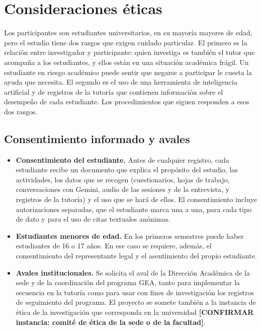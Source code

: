 \section{Consideraciones éticas}
\label{sec:consideraciones_eticas}

Los participantes son estudiantes universitarios, en su mayoría mayores de edad, pero el estudio tiene dos rasgos que exigen cuidado particular. El primero es la relación entre investigador y participante: quien investiga es también el tutor que acompaña a los estudiantes, y ellos están en una situación académica frágil. Un estudiante en riesgo académico puede sentir que negarse a participar le cuesta la ayuda que necesita. El segundo es el uso de una herramienta de inteligencia artificial y de registros de la tutoría que contienen información sobre el desempeño de cada estudiante. Los procedimientos que siguen responden a esos dos rasgos.

\subsection{Consentimiento informado y avales}

\begin{itemize}
\item \textbf{Consentimiento del estudiante.} Antes de cualquier registro, cada estudiante recibe un documento que explica el propósito del estudio, las actividades, los datos que se recogen (cuestionarios, hojas de trabajo, conversaciones con Gemini, audio de las sesiones y de la entrevista, y registros de la tutoría) y el uso que se hará de ellos. El consentimiento incluye autorizaciones separadas, que el estudiante marca una a una, para cada tipo de dato y para el uso de citas textuales anónimas.

\item \textbf{Estudiantes menores de edad.} En los primeros semestres puede haber estudiantes de 16 o 17 años. En ese caso se requiere, además, el consentimiento del representante legal y el asentimiento del propio estudiante.

\item \textbf{Avales institucionales.} Se solicita el aval de la Dirección Académica de la sede y de la coordinación del programa GEA, tanto para implementar la secuencia en la tutoría como para usar con fines de investigación los registros de seguimiento del programa. El proyecto se somete también a la instancia de ética de la investigación que corresponda en la universidad \textbf{[CONFIRMAR instancia: comité de ética de la sede o de la facultad]}.
\end{itemize}

